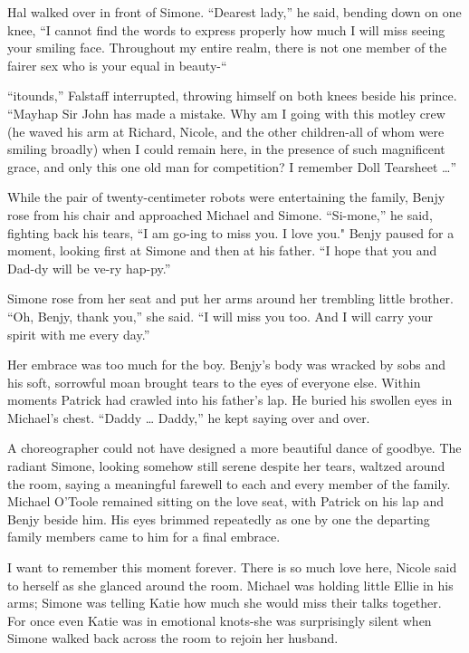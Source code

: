 \documentclass[]{article}
\begin{document}
{Hal walked over in front of Simone.  “Dearest lady,” he said, bending down on one knee, “I cannot find the words to express properly how much I will miss seeing your smiling face.  Throughout my entire realm, there is not one member of the fairer sex who is your equal in beauty-“

“itounds,” Falstaff interrupted, throwing himself on both knees beside his prince.  “Mayhap Sir John has made a mistake.  Why am I going with this motley crew (he waved his arm at Richard, Nicole, and the other children-all of whom were smiling broadly) when I could remain here, in the presence of such magnificent grace, and only this one old man for competition? I remember Doll Tearsheet …”

While the pair of twenty-centimeter robots were entertaining the family, Benjy rose from his chair and approached Michael and Simone.  “Si-mone,” he said, fighting back his tears, “I am go-ing to miss you.  I love you."  Benjy paused for a moment, looking first at Simone and then at his father.  “I hope that you and Dad-dy will be ve-ry hap-py.”

Simone rose from her seat and put her arms around her trembling little brother.  “Oh, Benjy, thank you,” she said.  “I will miss you too.  And I will carry your spirit with me every day.”

Her embrace was too much for the boy.  Benjy’s body was wracked by sobs and his soft, sorrowful moan brought tears to the eyes of everyone else.  Within moments Patrick had crawled into his father’s lap.  He buried his swollen eyes in Michael’s chest.  “Daddy … Daddy,” he kept saying over and over.

A choreographer could not have designed a more beautiful dance of goodbye.  The radiant Simone, looking somehow still serene despite her tears, waltzed around the room, saying a meaningful farewell to each and every member of the family.  Michael O’Toole remained sitting on the love seat, with Patrick on his lap and Benjy beside him.  His eyes brimmed repeatedly as one by one the departing family members came to him for a final embrace.

I want to remember this moment forever.  There is so much love here, Nicole said to herself as she glanced around the room.  Michael was holding little Ellie in his arms; Simone was telling Katie how much she would miss their talks together.  For once even Katie was in emotional knots-she was surprisingly silent when Simone walked back across the room to rejoin her husband.

}
\end{document}
